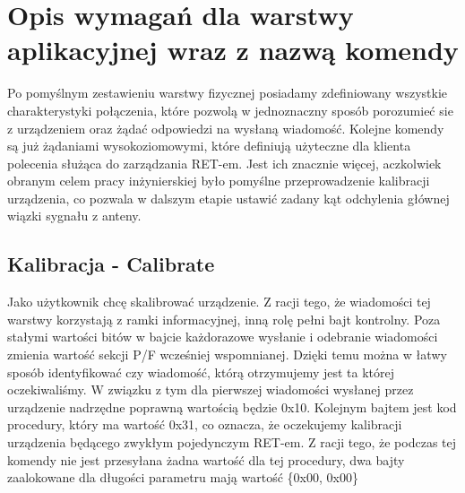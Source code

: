 	\section{Opis wymagań dla warstwy aplikacyjnej wraz z nazwą komendy}
		Po pomyślnym zestawieniu warstwy fizycznej posiadamy zdefiniowany wszystkie charakterystyki połączenia, które pozwolą w jednoznaczny sposób porozumieć sie z urządzeniem oraz żądać odpowiedzi na wysłaną wiadomość.
		Kolejne komendy są już żądaniami wysokoziomowymi, które definiują użyteczne dla klienta polecenia służąca do zarządzania RET-em. Jest ich znacznie więcej, aczkolwiek obranym celem pracy inżynierskiej było pomyślne przeprowadzenie
		kalibracji urządzenia, co pozwala w dalszym etapie ustawić zadany kąt odchylenia głównej wiązki sygnału z anteny.
		\subsection{Kalibracja - Calibrate}
			Jako użytkownik chcę skalibrować urządzenie.
			\newline\newline
			Z racji tego, że wiadomości tej warstwy korzystają z ramki informacyjnej, inną rolę pełni bajt kontrolny. Poza stałymi wartości bitów w bajcie 
			każdorazowe wysłanie i odebranie wiadomości zmienia wartość sekcji P/F wcześniej wspomnianej. 
			Dzięki temu można w łatwy sposób identyfikować czy wiadomość, którą otrzymujemy jest ta której oczekiwaliśmy. 
			W związku z tym dla pierwszej wiadomości wysłanej przez urządzenie nadrzędne poprawną wartością będzie 0x10.
			\newline
			Kolejnym bajtem jest kod procedury, który ma wartość 0x31, co oznacza, że oczekujemy kalibracji urządzenia będącego zwykłym pojedynczym RET-em.
			\newline
			Z racji tego, że podczas tej komendy nie jest przesyłana żadna wartość dla tej procedury, dwa bajty zaalokowane dla długości parametru mają wartość \{0x00, 0x00\}
